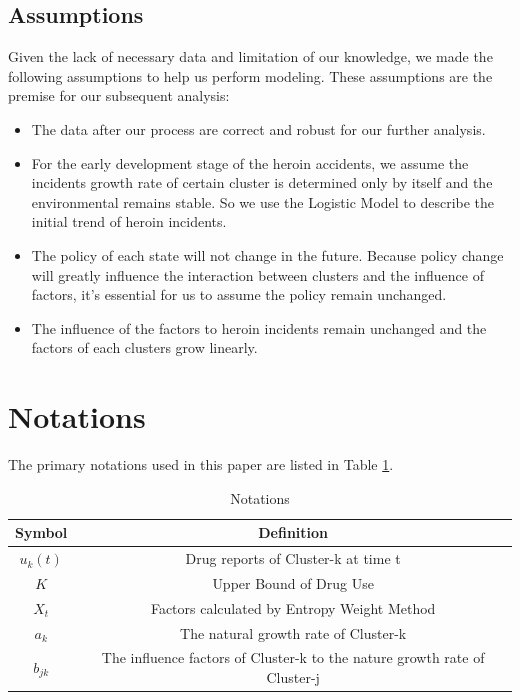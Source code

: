 \documentclass[12pt]{article}
\begin{document}
\subsection{Assumptions}
Given the lack of necessary data and limitation of our knowledge, we made the following assumptions to help us perform modeling. These assumptions are the premise for our subsequent analysis:
\begin{itemize}
	\item The data after our process are correct and robust for our further analysis.
	\item For the early development stage of the heroin accidents, we assume the incidents growth rate of certain cluster is determined only by itself and the environmental remains stable. So we use the Logistic Model to describe the initial trend of heroin incidents.
	\item The policy of each state will not change in the future. Because policy change will greatly influence the interaction between clusters and the influence of factors, it’s essential for us to assume the policy remain unchanged.
	\item The influence of the factors to heroin incidents remain unchanged and the factors of each clusters grow linearly.
\end{itemize}

\section{Notations}
The primary notations used in this paper are listed in Table \ref{tb:notation}.
\begin{table}[!htbp]
\small
\begin{center}
\caption{Notations}
\begin{tabular}{cc}
	\toprule
	\multicolumn{1}{m{3cm}}{\centering Symbol}
	&\multicolumn{1}{m{8cm}}{\centering Definition}\\
	\midrule
	$u_{k}(t)$ &Drug reports of Cluster-k at time t\\
	$ K $ & Upper Bound of Drug Use \\
	$X_{t}$ & Factors calculated by Entropy Weight Method\\
	$a_{k}$ & The natural growth rate of Cluster-k\\
	$b_{jk}$ & The influence factors of Cluster-k to the nature growth rate of Cluster-j\\
	\bottomrule
\end{tabular}\label{tb:notation}
\end{center}
\end{table}
\end{document}

